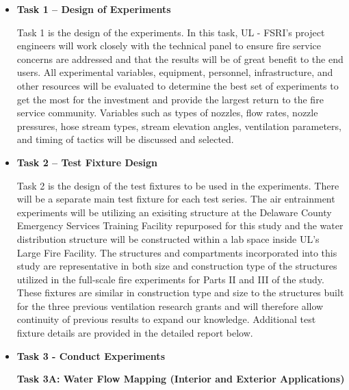 \documentclass{article}
\begin{document}
\begin{itemize}

\item \bf{Task 1 – Design of Experiments}
\normalfont
\vspace*{\baselineskip}

Task 1 is the design of the experiments. In this task, UL - FSRI's project engineers will work closely with the technical panel to ensure fire service concerns are addressed and that the results will be of great benefit to the end users. All experimental variables, equipment, personnel, infrastructure, and other resources will be evaluated to determine the best set of experiments to get the most for the investment and provide the largest return to the fire service community. Variables such as types of nozzles, flow rates, nozzle pressures, hose stream types, stream elevation angles, ventilation parameters, and timing of tactics will be discussed and selected.  
\vspace*{\baselineskip}

\item \bf{Task 2 – Test Fixture Design}
\normalfont
\vspace*{\baselineskip}

Task 2 is the design of the test fixtures to be used in the experiments. There will be a separate main test fixture for each test series. The air entrainment experiments will be utilizing an exisiting structure at the Delaware County Emergency Services Training Facility repurposed for this study and the water distribution structure will be constructed within a lab space inside UL’s Large Fire Facility. The structures and compartments incorporated into this study are representative in both size and construction type of the structures utilized in the full-scale fire experiments for Parts II and III of the study. These fixtures are similar in construction type and size to the structures built for the three previous ventilation research grants and will therefore allow continuity of previous results to expand our knowledge. Additional test fixture details are provided in the detailed report below.
\vspace*{\baselineskip}

\item \bf{Task 3 - Conduct Experiments}
\normalfont
\vspace*{\baselineskip}

\subitem \bf{Task 3A:  Water Flow Mapping (Interior and Exterior Applications)}
\normalfont
\vspace*{\baselineskip} 


\end{itemize}
\end{document}
